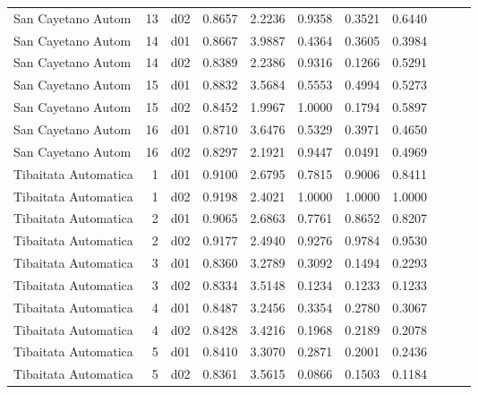 \begin{landscape}
\begin{longtable}{p{2cm}rrrrrrrrrr}
     San Cayetano Autom   &         13 &     d02 &   0.8657 &  2.2236 &        0.9358 &           0.3521 &  0.6440 \\
     San Cayetano Autom   &         14 &     d01 &   0.8667 &  3.9887 &        0.4364 &           0.3605 &  0.3984 \\
     San Cayetano Autom   &         14 &     d02 &   0.8389 &  2.2386 &        0.9316 &           0.1266 &  0.5291 \\
     San Cayetano Autom   &         15 &     d01 &   0.8832 &  3.5684 &        0.5553 &           0.4994 &  0.5273 \\
     San Cayetano Autom   &         15 &     d02 &   0.8452 &  1.9967 &        1.0000 &           0.1794 &  0.5897 \\
     San Cayetano Autom   &         16 &     d01 &   0.8710 &  3.6476 &        0.5329 &           0.3971 &  0.4650 \\
     San Cayetano Autom   &         16 &     d02 &   0.8297 &  2.1921 &        0.9447 &           0.0491 &  0.4969 \\
    Tibaitata Automatica  &          1 &     d01 &   0.9100 &  2.6795 &        0.7815 &           0.9006 &  0.8411 \\
    Tibaitata Automatica  &          1 &     d02 &   0.9198 &  2.4021 &        1.0000 &           1.0000 &  1.0000 \\
    Tibaitata Automatica  &          2 &     d01 &   0.9065 &  2.6863 &        0.7761 &           0.8652 &  0.8207 \\
    Tibaitata Automatica  &          2 &     d02 &   0.9177 &  2.4940 &        0.9276 &           0.9784 &  0.9530 \\
    Tibaitata Automatica  &          3 &     d01 &   0.8360 &  3.2789 &        0.3092 &           0.1494 &  0.2293 \\
    Tibaitata Automatica  &          3 &     d02 &   0.8334 &  3.5148 &        0.1234 &           0.1233 &  0.1233 \\
    Tibaitata Automatica  &          4 &     d01 &   0.8487 &  3.2456 &        0.3354 &           0.2780 &  0.3067 \\
    Tibaitata Automatica  &          4 &     d02 &   0.8428 &  3.4216 &        0.1968 &           0.2189 &  0.2078 \\
    Tibaitata Automatica  &          5 &     d01 &   0.8410 &  3.3070 &        0.2871 &           0.2001 &  0.2436 \\
    Tibaitata Automatica  &          5 &     d02 &   0.8361 &  3.5615 &        0.0866 &           0.1503 &  0.1184 \\

\end{longtable}
\end{landscape}
